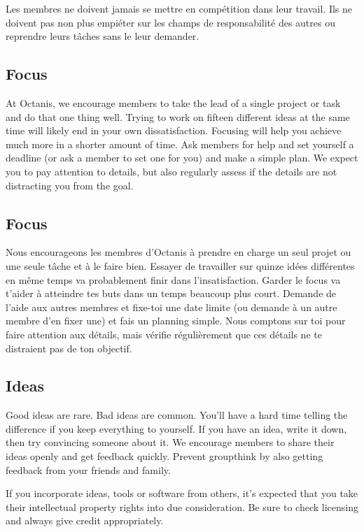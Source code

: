 	Les membres ne doivent jamais se mettre en compétition dans leur travail. Ils ne doivent pas non plus empiéter sur les champs de responsabilité des autres ou reprendre leurs tâches sans le leur demander.


	
\english
	\subsection{Focus}
	At Octanis, we encourage members to take the lead of a single project or task and do that one thing well. Trying to work on fifteen different ideas at the same time will likely end in your own dissatisfaction. Focusing will help you achieve much more in a shorter amount of time. Ask members for help and set yourself a deadline (or ask a member to set one for you) and make a simple plan.
	We expect you to pay attention to details, but also regularly assess if the details are not distracting you from the goal.




\french
	\subsection{Focus}
	Nous encourageons les membres d'Octanis à prendre en charge un seul projet ou une seule tâche et à le faire bien. Essayer de travailler sur quinze idées différentes en même temps va probablement finir dans l'insatisfaction. Garder le focus va t'aider à atteindre tes buts dans un temps beaucoup plus court. Demande de l'aide aux autres membres et fixe-toi une date limite (ou demande à un autre membre d'en fixer une) et fais un planning simple. 
	Nous comptons sur toi pour faire attention aux détails, mais vérifie régulièrement que ces détails ne te distraient pas de ton objectif. 
	

\english
	\subsection{Ideas}
	Good ideas are rare. Bad ideas are common. You'll have a hard time telling the difference if you keep everything to yourself.
	If you have an idea, write it down, then try convincing someone about it. We encourage members to share their ideas openly and get feedback quickly. Prevent groupthink by also getting feedback from your friends and family.

	If you incorporate ideas, tools or software from others, it's expected that you take their intellectual property rights into due consideration. Be sure to check licensing and always give credit appropriately.

